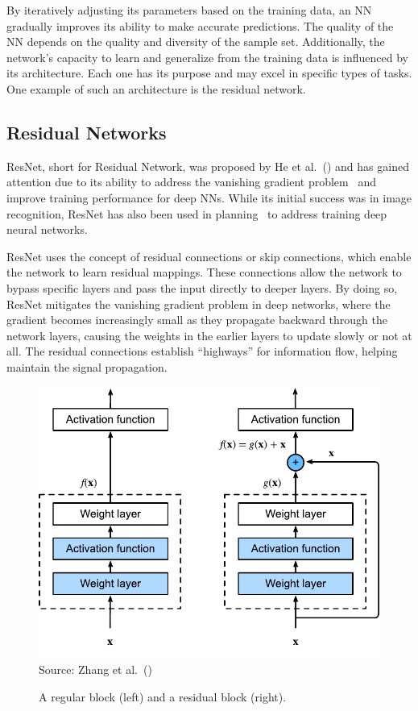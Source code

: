 By iteratively adjusting its parameters based on the training data, an NN gradually improves its ability to make accurate predictions. The quality of the NN depends on the quality and diversity of the sample set. Additionally, the network's capacity to learn and generalize from the training data is influenced by its architecture. Each one has its purpose and may excel in specific types of tasks. One example of such an architecture is the residual network.

\subsection{Residual Networks}
\label{sec:background_resnets}

ResNet, short for Residual Network, was proposed by He et al.~(\citeyear{He.etal/2016}) and has gained attention due to its ability to address the vanishing gradient problem~\cite{Hochreiter/1998} and improve training performance for deep NNs. While its initial success was in image recognition, ResNet has also been used in planning~\cite{Agostinelli.etal/2019,Ferber.etal/2022} to address training deep neural networks.

ResNet uses the concept of residual connections or skip connections, which enable the network to learn residual mappings. These connections allow the network to bypass specific layers and pass the input directly to deeper layers. By doing so, ResNet mitigates the vanishing gradient problem in deep networks, where the gradient becomes increasingly small as they propagate backward through the network layers, causing the weights in the earlier layers to update slowly or not at all. The residual connections establish ``highways'' for information flow, helping maintain the signal propagation.

\begin{figure}[t]
    \caption[A regular block and a residual block.]{A regular block (left) and a residual block (right).}
    \label{fig:residual_block}
    \addvspace{\baselineskip}
    \centering
    \includegraphics[width=0.75\linewidth]{figures/residual_block.pdf} \\
    Source: Zhang et al.~(\citeyear{Zhang.etal/2021})
\end{figure}

